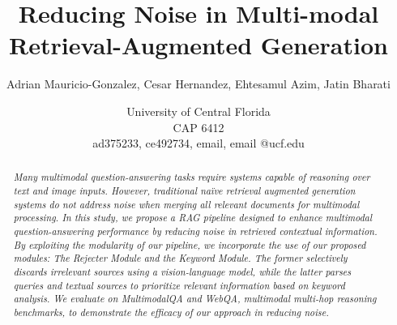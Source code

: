 \documentclass[twocolumn]{article}
\title{Reducing Noise in Multi-modal Retrieval-Augmented Generation}
\author{Adrian Mauricio-Gonzalez, Cesar Hernandez, Ehtesamul Azim, Jatin Bharati}
\date{University of Central Florida \\ CAP 6412 \\ ad375233, ce492734, email, email @ucf.edu}
\begin{document}
\maketitle

\begin{abstract}
\textit{Many multimodal question-answering tasks require systems capable of reasoning over text and image inputs. However, traditional naïve retrieval augmented generation systems do not address noise when merging all relevant documents for multimodal processing. In this study, we propose a RAG pipeline designed to enhance multimodal question-answering performance by reducing noise in retrieved contextual information. By exploiting the modularity of our pipeline, we incorporate the use of our proposed modules: The Rejecter Module and the Keyword Module. The former selectively discards irrelevant sources using a vision-language model, while the latter parses queries and textual sources to prioritize relevant information based on keyword analysis. We evaluate on MultimodalQA and WebQA, multimodal multi-hop reasoning benchmarks, to demonstrate the efficacy of our approach in reducing noise.}
\end{abstract}
\end{document}
